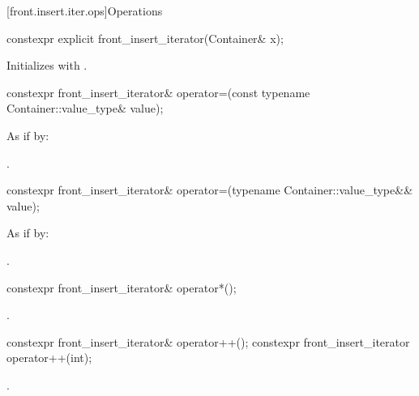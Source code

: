 [front.insert.iter.ops]{Operations}

%
\begin{itemdecl}
constexpr explicit front_insert_iterator(Container& x);
\end{itemdecl}

\begin{itemdescr}
\pnum
\effects
Initializes
with .
\end{itemdescr}

%
\begin{itemdecl}
constexpr front_insert_iterator& operator=(const typename Container::value_type& value);
\end{itemdecl}

\begin{itemdescr}
\pnum
\effects
As if by: 

\pnum
\returns
{}.
\end{itemdescr}

%
\begin{itemdecl}
constexpr front_insert_iterator& operator=(typename Container::value_type&& value);
\end{itemdecl}

\begin{itemdescr}
\pnum
\effects
As if by: 

\pnum
\returns
{}.
\end{itemdescr}

%
\begin{itemdecl}
constexpr front_insert_iterator& operator*();
\end{itemdecl}

\begin{itemdescr}
\pnum
\returns
{}.
\end{itemdescr}

%
\begin{itemdecl}
constexpr front_insert_iterator& operator++();
constexpr front_insert_iterator  operator++(int);
\end{itemdecl}

\begin{itemdescr}
\pnum
\returns
{}.
\end{itemdescr}


